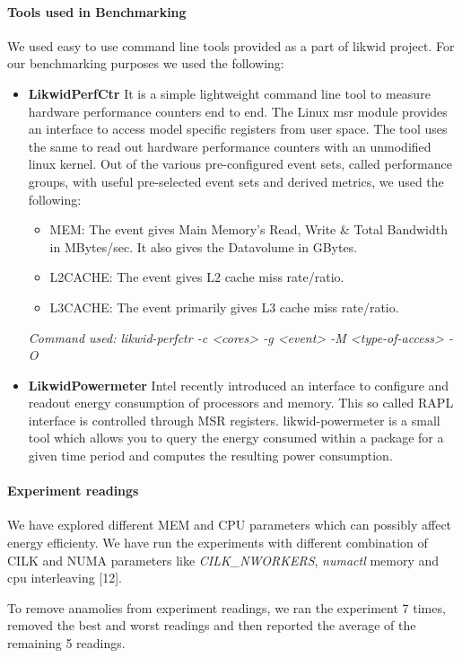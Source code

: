 \paragraph{Tools used in Benchmarking}
We used easy to use command line tools provided as a part of likwid
project. For our benchmarking purposes we used the following:
\begin{itemize}[leftmargin=*]
\item \textbf{LikwidPerfCtr}
It is a simple lightweight command line tool to measure hardware 
performance counters end to end. The Linux msr module provides
an interface to access model specific registers from user space.
The tool uses the same to read out hardware
performance counters with an unmodified linux kernel. Out of the
various pre-configured event sets, called performance groups, with
useful pre-selected event sets and derived metrics, we used the 
following:
\begin{itemize}[leftmargin=*]
\item MEM: The event gives Main Memory's Read, Write \& Total 
Bandwidth in MBytes/sec. It also gives the Datavolume in GBytes.
\item L2CACHE: The event gives L2 cache miss rate/ratio.
\item L3CACHE: The event primarily gives L3 cache miss rate/ratio.
\end{itemize}
\emph{Command used: likwid-perfctr -c <cores> -g <event> -M <type-of-access> -O} 
\item \textbf{LikwidPowermeter}
Intel recently introduced an interface to configure and readout 
energy consumption of processors and memory. This so called RAPL 
interface is controlled through MSR registers. likwid-powermeter 
is a small tool which allows you to query the energy consumed within 
a package for a given time period and computes the resulting power 
consumption.
\end{itemize}


\paragraph{Experiment readings}
We have explored different MEM and CPU parameters which can possibly
affect energy efficienty.  We have run the experiments with different
combination of CILK and NUMA parameters like \emph{CILK\_NWORKERS},
\emph{numactl} memory and cpu interleaving [12].

To remove anamolies from experiment readings, we ran the experiment 7
times, removed the best and worst readings and then reported the 
average of the remaining 5 readings.


